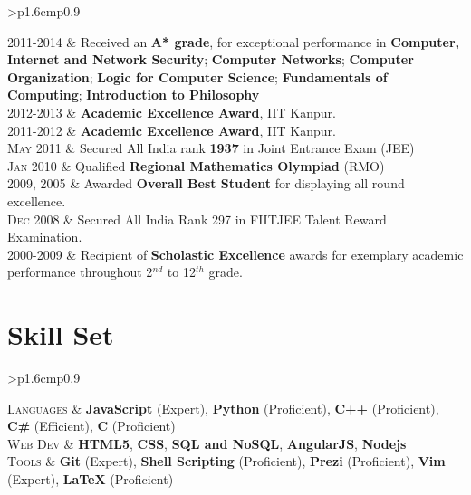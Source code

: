 \documentclass[a4paper,10pt]{article} %
\newcommand{\itemlist}[1]{
    \begin{tabular}{>{\raggedleft}p{1.6cm}p{0.9\linewidth}}
        #1
    \end{tabular}
}
\begin{document}
\itemlist {
    \textsc{2011-2014}   & Received an \textbf{A* grade}, for exceptional performance in
                            \textbf{Computer, Internet and Network Security};
                            \textbf{Computer Networks};
                            \textbf{Computer Organization};
                            \textbf{Logic for Computer Science};
                            \textbf{Fundamentals of Computing};
                            \textbf{Introduction to Philosophy} \\
    \textsc{2012-2013}   & \textbf{Academic Excellence Award}, IIT Kanpur. \\
    \textsc{2011-2012}   & \textbf{Academic Excellence Award}, IIT Kanpur. \\
    \textsc{May 2011}    & Secured All India rank \textbf{1937} in Joint Entrance Exam (JEE) \\
    \textsc{Jan 2010}    & Qualified \textbf{Regional Mathematics Olympiad} (RMO) \\
    \textsc{2009, 2005}  & Awarded \textbf{Overall Best Student} for displaying all round excellence. \\
    \textsc{Dec 2008}    & Secured All India Rank 297 in FIITJEE Talent Reward Examination. \\
    \textsc{2000-2009}   & Recipient of \textbf{Scholastic Excellence} awards for exemplary academic performance throughout
                            2$^{nd}$ to 12$^{th}$ grade. \\
}

\section{Skill Set}

\itemlist {
    \textsc{Languages} %
            & \textbf{JavaScript} (Expert), \textbf{Python} (Proficient), \textbf{C++} (Proficient), \textbf{C\#} (Efficient),
              \textbf{C} (Proficient)\\
    \textsc{Web Dev} %
            & \textbf{HTML5}, \textbf{CSS}, \textbf{SQL and NoSQL}, \textbf{AngularJS}, \textbf{Nodejs}\\
    \textsc{Tools} %
            & \textbf{Git} (Expert), \textbf{Shell Scripting} (Proficient), \textbf{Prezi} (Proficient), \textbf{Vim} (Expert), \textbf{LaTeX}
              (Proficient)\\
}
\end{document}
